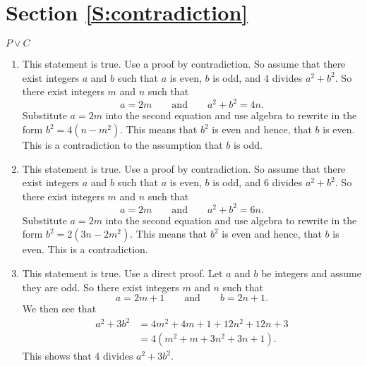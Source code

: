 \section*{Section \ref{S:contradiction}}
\renewcommand{\labelenumi}{(\textbf{\alph{enumi}})}

\begin{list}{\bf{\ref{exer:sec33-1}.}}
\item \begin{list}{\bf{(a)}}
\item $P \vee C$
\end{list}
\end{list}


\begin{list}{\bf{\ref{exer:sec32-truefalse}.}}
\item \begin{enumerate}
\item This statement is true.  Use a proof by contradiction.  So assume that there exist integers  $a$ and $b$ such that $a$ is even, $b$ is odd, and 4 divides $a^2 + b^2$.  So there exist integers $m$ and 
$n$ such that
\[
a = 2m \qquad \text{and} \qquad a^2 + b^2 = 4n.
\]
Substitute $a = 2m$ into the second equation and use algebra to rewrite in the form 
$b^2 = 4(n - m^2)$.  This means that $b^2$ is even and hence, that $b$ is even.  This is a contradiction to the assumption that $b$ is odd.


\item This statement is true.  Use a proof by contradiction.  So assume that there exist integers $a$ and $b$ such that  $a$ is even, $b$ is odd, and 6 divides $a^2 + b^2$.  So there exist integers $m$ and 
$n$ such that
\[
a = 2m \qquad \text{and} \qquad a^2 + b^2 = 6n.
\]
Substitute $a = 2m$ into the second equation and use algebra to rewrite in the form 
$b^2 = 2(3n - 2m^2)$.  This means that $b^2$ is even and hence, that $b$ is even.  This is a contradiction.

\addtocounter{enumi}{1}
\item This statement is true.  Use a direct proof.  Let $a$ and $b$ be integers and assume they are odd.  So there exist integers $m$ and $n$ such that
\[
a = 2m + 1 \qquad \text{and} \qquad b = 2n + 1.
\]
We then see that
\begin{align*}
a^2 + 3b^2 &= 4m^2 + 4m + 1 + 12n^2 + 12n + 3 \\
           &= 4\left( m^2 + m + 3n^2 + 3n + 1 \right).
\end{align*}
This shows that 4 divides $a^2 + 3b^2$.
\end{enumerate}
\end{list}





